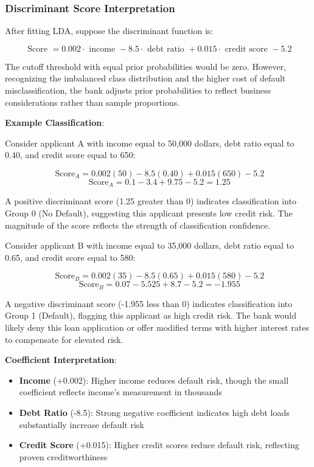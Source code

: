 \documentclass[
]{article}
\begin{document}
\subsubsection{Discriminant Score Interpretation}

After fitting LDA, suppose the discriminant function is:

\[\text{ Score } = 0.002 \cdot \text{ income } - 8.5 \cdot \text{ debt ratio } + 0.015 \cdot \text{ credit score } - 5.2\]

The cutoff threshold with equal prior probabilities would be zero.
However, recognizing the imbalanced class distribution and the higher
cost of default misclassification, the bank adjusts prior probabilities
to reflect business considerations rather than sample proportions.

\textbf{Example Classification}:

Consider applicant A with income equal to 50,000 dollars, debt ratio
equal to 0.40, and credit score equal to 650:

\[\text{ Score}_{A} = 0.002(50) - 8.5(0.40) + 0.015(650) - 5.2\]
\[\text{ Score}_{A} = 0.1 - 3.4 + 9.75 - 5.2 = 1.25\]

A positive discriminant score (1.25 greater than 0) indicates
classification into Group 0 (No Default), suggesting this applicant
presents low credit risk. The magnitude of the score reflects the
strength of classification confidence.

Consider applicant B with income equal to 35,000 dollars, debt ratio
equal to 0.65, and credit score equal to 580:

\[\text{ Score}_{B} = 0.002(35) - 8.5(0.65) + 0.015(580) - 5.2\]
\[\text{ Score}_{B} = 0.07 - 5.525 + 8.7 - 5.2 = - 1.955\]

A negative discriminant score (-1.955 less than 0) indicates
classification into Group 1 (Default), flagging this applicant as high
credit risk. The bank would likely deny this loan application or offer
modified terms with higher interest rates to compensate for elevated
risk.

\textbf{Coefficient Interpretation}:

\begin{itemize}
\item
  \textbf{Income} (+0.002): Higher income reduces default risk, though
  the small coefficient reflects income's measurement in thousands
\item
  \textbf{Debt Ratio} (-8.5): Strong negative coefficient indicates high
  debt loads substantially increase default risk
\item
  \textbf{Credit Score} (+0.015): Higher credit scores reduce default
  risk, reflecting proven creditworthiness
\end{itemize}
\end{document}
